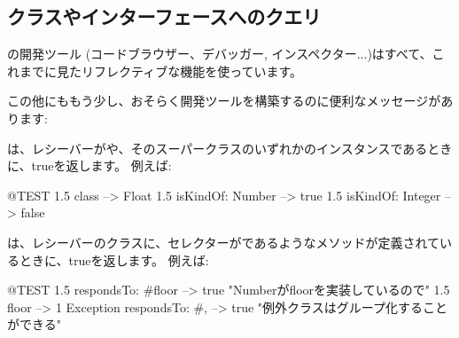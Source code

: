 \documentclass[a4paper,10pt,twoside]{book}
\begin{document}
\subsection{クラスやインターフェースへのクエリ}

\pharo の開発ツール (コードブラウザー、デバッガー, インスペクター...)はすべて、これまでに見たリフレクティブな機能を使っています。

この他にももう少し、おそらく開発ツールを構築するのに便利なメッセージがあります:

は、レシーバーがや、そのスーパークラスのいずれかのインスタンスであるときに、trueを返します。
例えば:
\begin{code}{@TEST}
1.5 class                     --> Float
1.5 isKindOf: Number --> true
1.5 isKindOf: Integer   --> false
\end{code}

は、レシーバーのクラスに、セレクターがであるようなメソッドが定義されているときに、trueを返します。%
例えば:
\begin{code}{@TEST}
1.5 respondsTo: #floor      --> true    "Numberがfloorを実装しているので"
1.5 floor                            --> 1
Exception respondsTo: #, --> true    "例外クラスはグループ化することができる"
\end{code}
\end{document}
